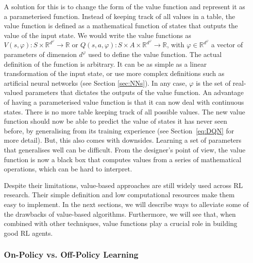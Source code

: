 A solution for this is to change the form of the value function and represent it as a parameterised function. Instead of keeping track of all values in a table, the value function is defined as a mathematical function of states that outputs the value of the input state. We would write the value functions as $V(s,\varphi):S\times\mathbb{R}^{d^\varphi}\rightarrow\mathbb{R}$ or $Q(s,a,\varphi):S\times A\times\mathbb{R}^{d^\varphi}\rightarrow\mathbb{R}$, with $\varphi\in\mathbb{R}^{d^\varphi}$ a vector of parameters of dimension $d^\varphi$ used to define the value function. The actual definition of the function is arbitrary. It can be as simple as a linear transformation of the input state, or use more complex definitions such as artificial neural networks (see Section \ref{sec:NNs}). In any case, $\varphi$ is the set of real-valued parameters that dictates the outputs of the value function. An advantage of having a parameterised value function is that it can now deal with continuous states. There is no more table keeping track of all possible values. The new value function should now be able to predict the value of states it has never seen before, by generalising from its training experience (see Section~\ref{eq:DQN} for more detail). But, this also comes with downsides. Learning a set of parameters that generalises well can be difficult. From the designer's point of view, the value function is now a black box that computes values from a series of mathematical operations, which can be hard to interpret. 

Despite their limitations, value-based approaches are still widely used across RL research. Their simple definition and low computational resources make them easy to implement. In the next sections, we will describe ways to alleviate some of the drawbacks of value-based algorithms. Furthermore, we will see that, when combined with other techniques, value functions play a crucial role in building good RL agents. 

\subsubsection{On-Policy vs. Off-Policy Learning}\label{sec:RL:On/Off-policy}

